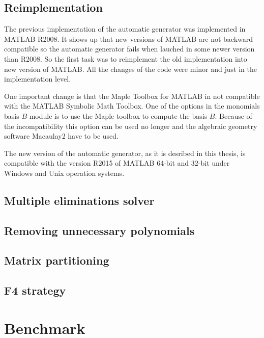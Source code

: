 \subsection{Reimplementation}
The previous implementation \cite{AutoGen} of the automatic generator was implemented in MATLAB R2008. It shows up that new versions of MATLAB are not backward compatible so the automatic generator fails when lauched in some newer version than R2008. So the first task was to reimplement the old implementation into new version of MATLAB. All the changes of the code were minor and just in the implementation level.

One important change is that the Maple Toolbox for MATLAB in not compatible with the MATLAB Symbolic Math Toolbox. One of the options in the monomials basis $B$ module is to use the Maple toolbox to compute the basis $B$. Because of the incompatibility this option can be used no longer and the algebraic geometry software Macaulay2 \cite{M2} have to be used.

The new version of the automatic generator, as it is desribed in this thesis, is compatible with the version R2015 of MATLAB 64-bit and 32-bit under Windows and Unix operation systems.

\subsection{Multiple eliminations solver}

\subsection{Removing unnecessary polynomials}

\subsection{Matrix partitioning}

\subsection{F4 strategy}

\section{Benchmark}
